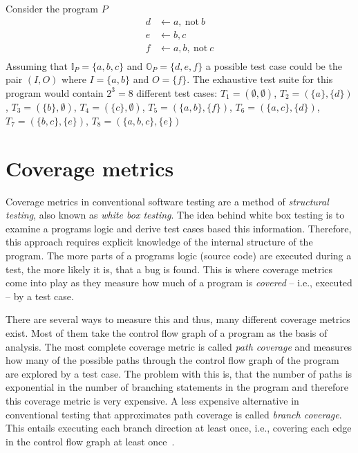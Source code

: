 \begin{example}
\label{ex:test suite}
    Consider the program $P$
    \begin{align*}
        d &\leftarrow a,\ \text{not}\ b \\
        e &\leftarrow b, c \\
        f &\leftarrow a, b,\ \text{not}\ c \\
    \end{align*}
    Assuming that \(\mathbb{I}_P = \{a, b, c\}\) and \(\mathbb{O}_P = \{d, e, f\}\) a possible test case could be the pair \((I, O)\) where \(I = \{a, b\}\) and \(O = \{f\}\).
    The exhaustive test suite for this program would contain \(2^3 = 8\) different test cases: \(T_1 = (\emptyset, \emptyset)\), \(T_2 = (\{a\}, \{d\})\), \(T_3 
 = (\{b\}, \emptyset)\), \(T_4 = (\{c\}, \emptyset)\), \(T_5 = (\{a, b\}, \{f\})\), \(T_6 = (\{a, c\}, \{d\})\), \(T_7 = (\{b, c\}, \{e\})\), \(T_8 = (\{a, b, c\}, \{e\})\)
\end{example}

\begin{comment}
- maybe Specification -> the correct (expected) output for every input, what does it mean for a program to "pass/be compliant 
with" a testcase, when is a program "correct" with respect to a specification (not actually needed for coverage as coverage 
does not care about specification!)    
\end{comment}


\chapter{Coverage metrics}
\label{ch:Coverage metrics}
Coverage metrics in conventional software testing are a method of \emph{structural testing}, also known as \emph{white box testing}. The idea behind white box testing is to examine a programs logic and derive test cases based this information. Therefore, this approach requires explicit knowledge of the internal structure of the program. The more parts of a programs logic (source code) are executed during a test, the more likely it is, that a bug is found. This is where coverage metrics come into play as they measure how much of a program is \emph{covered} -- i.e., executed -- by a test case.

There are several ways to measure this and thus, many different coverage metrics exist. Most of them take the control flow graph of a program as the basis of analysis. The most complete coverage metric is called \emph{path coverage} and measures how many of the possible paths through the control flow graph of the program are explored by a test case. The problem with this is, that the number of paths is exponential in the number of branching statements in the program and therefore this coverage metric is very expensive. A less expensive alternative in conventional testing that approximates path coverage is called \emph{branch coverage}. This entails executing each branch direction at least once, i.e., covering each edge in the control flow graph at least once~\cite[41\psqq]{MB12}.

